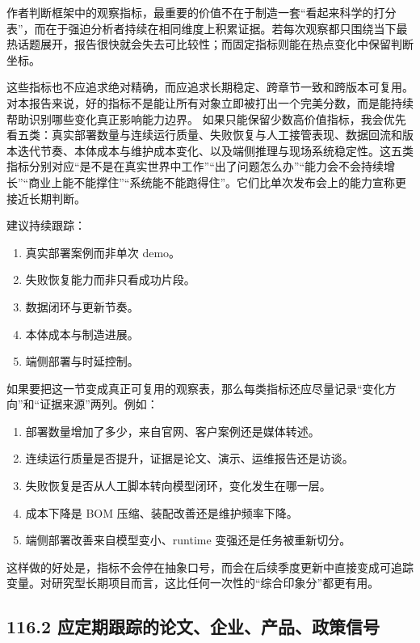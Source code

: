 作者判断框架中的观察指标，最重要的价值不在于制造一套“看起来科学的打分表”，而在于强迫分析者持续在相同维度上积累证据。若每次观察都只围绕当下最热话题展开，报告很快就会失去可比较性；而固定指标则能在热点变化中保留判断坐标。

这些指标也不应追求绝对精确，而应追求长期稳定、跨章节一致和跨版本可复用。对本报告来说，好的指标不是能让所有对象立即被打出一个完美分数，而是能持续帮助识别哪些变化真正影响能力边界。 如果只能保留少数高价值指标，我会优先看五类：真实部署数量与连续运行质量、失败恢复与人工接管表现、数据回流和版本迭代节奏、本体成本与维护成本变化、以及端侧推理与现场系统稳定性。这五类指标分别对应“是不是在真实世界中工作”“出了问题怎么办”“能力会不会持续增长”“商业上能不能撑住”“系统能不能跑得住”。它们比单次发布会上的能力宣称更接近长期判断。

建议持续跟踪：

\begin{enumerate}
\item 真实部署案例而非单次 demo。
\item 失败恢复能力而非只看成功片段。
\item 数据闭环与更新节奏。
\item 本体成本与制造进展。
\item 端侧部署与时延控制。
\end{enumerate}

如果要把这一节变成真正可复用的观察表，那么每类指标还应尽量记录“变化方向”和“证据来源”两列。例如：

\begin{enumerate}
\item 部署数量增加了多少，来自官网、客户案例还是媒体转述。
\item 连续运行质量是否提升，证据是论文、演示、运维报告还是访谈。
\item 失败恢复是否从人工脚本转向模型闭环，变化发生在哪一层。
\item 成本下降是 BOM 压缩、装配改善还是维护频率下降。
\item 端侧部署改善来自模型变小、runtime 变强还是任务被重新切分。
\end{enumerate}

这样做的好处是，指标不会停在抽象口号，而会在后续季度更新中直接变成可追踪变量。对研究型长期项目而言，这比任何一次性的“综合印象分”都更有用。

\subsection*{116.2 应定期跟踪的论文、企业、产品、政策信号}


